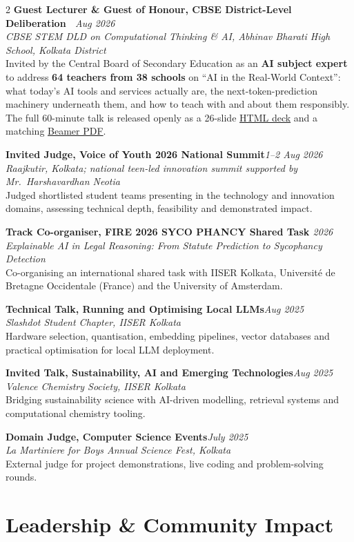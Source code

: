 \documentclass[a4paper,10.5pt]{extarticle}
\newcommand{\entryv}[4]{%
  {\normalsize\textbf{#1}}\hfill{\small\itshape\textcolor{mutedtext}{#2}}\\[0.04em]
  {\small\itshape\textcolor{mutedtext}{#3}}\\[0.04em]
  {\small #4}\par\vspace{3pt}%
}
\begin{document}
\begin{paracol}{2}
\entryv{Guest Lecturer \& Guest of Honour, CBSE District-Level Deliberation \href{https://shuvam-banerji-seal.github.io/ai-in-real-world-context/}{\faGlobe}~\href{https://github.com/Shuvam-Banerji-Seal/ai-in-real-world-context}{\faGithub}}{Aug 2026}{CBSE STEM DLD on Computational Thinking \& AI, Abhinav Bharati High School, Kolkata District}{%
Invited by the Central Board of Secondary Education as an \textbf{AI subject expert} to address \textbf{64 teachers from 38 schools} on ``AI in the Real-World Context'': what today's AI tools and services actually are, the next-token-prediction machinery underneath them, and how to teach with and about them responsibly. The full 60-minute talk is released openly as a 26-slide \href{https://shuvam-banerji-seal.github.io/ai-in-real-world-context/}{HTML deck} and a matching \href{https://shuvam-banerji-seal.github.io/ai-in-real-world-context/main.pdf}{Beamer PDF}.}

\entryv{Invited Judge, Voice of Youth 2026 National Summit}{1--2 Aug 2026}{Raajkutir, Kolkata; national teen-led innovation summit supported by Mr.~Harshavardhan Neotia}{%
Judged shortlisted student teams presenting in the technology and innovation domains, assessing technical depth, feasibility and demonstrated impact.}

\entryv{Track Co-organiser, FIRE 2026 SYCO PHANCY Shared Task \href{https://sycolex.com/}{\faGlobe}}{2026}{Explainable AI in Legal Reasoning: From Statute Prediction to Sycophancy Detection}{%
Co-organising an international shared task with IISER Kolkata, Universit\'e de Bretagne Occidentale (France) and the University of Amsterdam.}

\entryv{Technical Talk, Running and Optimising Local LLMs}{Aug 2025}{Slashdot Student Chapter, IISER Kolkata}{%
Hardware selection, quantisation, embedding pipelines, vector databases and practical optimisation for local LLM deployment.}

\entryv{Invited Talk, Sustainability, AI and Emerging Technologies}{Aug 2025}{Valence Chemistry Society, IISER Kolkata}{%
Bridging sustainability science with AI-driven modelling, retrieval systems and computational chemistry tooling.}

\entryv{Domain Judge, Computer Science Events}{July 2025}{La Martiniere for Boys Annual Science Fest, Kolkata}{%
External judge for project demonstrations, live coding and problem-solving rounds.}

\section{Leadership \& Community Impact}


\end{paracol}
\end{document}
